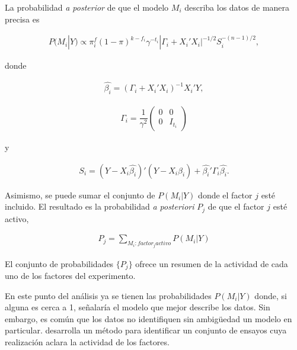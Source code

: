 La probabilidad \textit{a posterior} de que el modelo $M_i$ describa los datos de manera precisa es  


\begin{equation*}
	\begin{aligned}
		P(M_i | Y) \propto  \pi ^f_i (1 - \pi)^{k-f_i} \gamma^{-t_i} |\Gamma_i + X_i' X_i |^{-1/2} S_i^{-(n-1)/2}, 		
	\end{aligned}
\end{equation*}

\noindent donde

\begin{equation} \label{betai}
	\begin{aligned}
		\hat{\beta_i} = (\Gamma_i + X_i' X_i)^{-1} X_i ' Y, 
	\end{aligned}
\end{equation}

\begin{equation} \label{gamma_i}
	\begin{aligned}
		\Gamma_i = \dfrac{1}{\gamma^{2}} 
		\begin{pmatrix}
			0 & 0 \\
			0 & I_{t_i}
		\end{pmatrix} 
	\end{aligned}
\end{equation}

y 

\begin{equation} \label{delta_i}
	\begin{aligned}
		S_i = (Y - X_i \hat{\beta_i})' (Y - X_i \hat{\beta_i}) + \hat{\beta_i}' \Gamma_i \hat{\beta_i}.
	\end{aligned}
\end{equation}

Asimismo, se puede sumar el conjunto de $P(M_i | Y)$ donde el factor $j$ esté incluido. El resultado es la probabilidad \textit{a posteriori}  $P_j$ de que el factor $j$ esté activo, 

\begin{equation} \label{eq_pj}
	\begin{aligned}
		P_j = \sum_{M_i:factor_{j}activo} P(M_i | Y)
	\end{aligned}
\end{equation}

El conjunto de probabilidades $\{ P_j \}$ ofrece un resumen de la actividad de cada uno de los factores del experimento. 

En este punto del análisis ya se tienen las probabilidades $P(M_i | Y)$ donde, si alguna es cerca a 1, señalaría el modelo que mejor describe los datos. Sin embargo, es común que los datos no identifiquen sin ambigüedad un modelo en particular. \cite{Meyer} desarrolla un método para identificar un conjunto de ensayos cuya realización aclara la actividad de los factores. 

